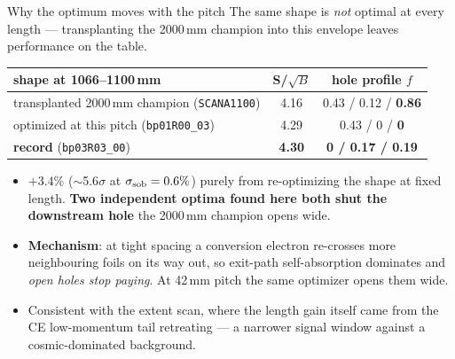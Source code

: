 \documentclass[aspectratio=169,10pt]{beamer}
\begin{document}
\begin{frame}{Why the optimum moves with the pitch}
\small
The same shape is \emph{not} optimal at every length --- transplanting the 2000\,mm champion
into this envelope leaves performance on the table.
\vspace{0.6em}
\begin{center}
\footnotesize
\begin{tabular}{@{}lcc@{}}
\toprule
shape at 1066--1100\,mm & S/$\sqrt{B}$ & hole profile $f$ \\
\midrule
transplanted 2000\,mm champion (\texttt{SCANA1100}) & 4.16 & 0.43 / 0.12 / \textbf{0.86} \\
optimized at this pitch (\texttt{bp01R00\_03})      & 4.29 & 0.43 / 0 / \textbf{0} \\
\textbf{record} (\texttt{bp03R03\_00})              & \textbf{4.30} & \textbf{0 / 0.17 / 0.19} \\
\bottomrule
\end{tabular}
\end{center}
\vspace{0.6em}
\begin{itemize}
  \item $+3.4\%$ ($\sim$5.6$\sigma$ at $\sigma_{\rm sob}=0.6\%$) purely from re-optimizing the
        shape at fixed length. \textbf{Two independent optima found here both shut the
        downstream hole} the 2000\,mm champion opens wide.
  \item \textbf{Mechanism}: at tight spacing a conversion electron re-crosses more neighbouring
        foils on its way out, so exit-path self-absorption dominates and \emph{open holes stop
        paying}. At 42\,mm pitch the same optimizer opens them wide.
  \item Consistent with the extent scan, where the length gain itself came from the CE
        low-momentum tail retreating --- a narrower signal window against a
        cosmic-dominated background.
\end{itemize}
\end{frame}
\end{document}
